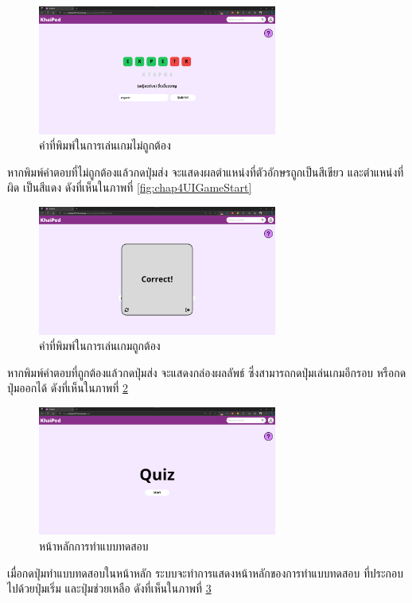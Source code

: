 \documentclass[12pt,oneside,openright,a4paper]{cpe-thai-project}
\begin{document}
\pagebreak
\begin{figure}[!h]\centering
	\includegraphics[width=0.7\textwidth, keepaspectratio=true]{image/chap4/UI/game/wrong.png}
	\caption{{คำที่พิมพ์ในการเล่นเกมไม่ถูกต้อง}}\label{fig:chap4UIGameWrong}
\end{figure}
\hspace{1cm}
หากพิมพ์คำตอบที่ไม่ถูกต้องแล้วกดปุ่มส่ง จะแสดงผลตำแหน่งที่ตัวอักษรถูกเป็นสีเขียว และตำแหน่งที่ผิด
เป็นสีแดง ดังที่เห็นในภาพที่ \ref{fig:chap4UIGameStart}

\begin{figure}[!h]\centering
	\includegraphics[width=0.7\textwidth, keepaspectratio=true]{image/chap4/UI/game/correct.png}
	\caption{{คำที่พิมพ์ในการเล่นเกมถูกต้อง}}\label{fig:chap4UIGameCorrect}
\end{figure}
\hspace{1cm}
หากพิมพ์คำตอบที่ถูกต้องแล้วกดปุ่มส่ง จะแสดงกล่องผลลัพธ์ ซึ่งสามารถกดปุ่มเล่นเกมอีกรอบ หรือกดปุ่มออกได้
ดังที่เห็นในภาพที่ \ref{fig:chap4UIGameCorrect}

\pagebreak
\begin{figure}[!h]\centering
	\includegraphics[width=0.7\textwidth, keepaspectratio=true]{image/chap4/UI/quiz/quiz.png}
	\caption{{หน้าหลักการทำแบบทดสอบ}}\label{fig:chap4UIQuiz}
\end{figure}
\hspace{1cm}
เมื่อกดปุ่มทำแบบทดสอบในหน้าหลัก ระบบจะทำการแสดงหน้าหลักของการทำแบบทดสอบ ที่ประกอบไปด้วยปุ่มเริ่ม และปุ่มช่วยเหลือ
ดังที่เห็นในภาพที่ \ref{fig:chap4UIQuiz}
\end{document}
